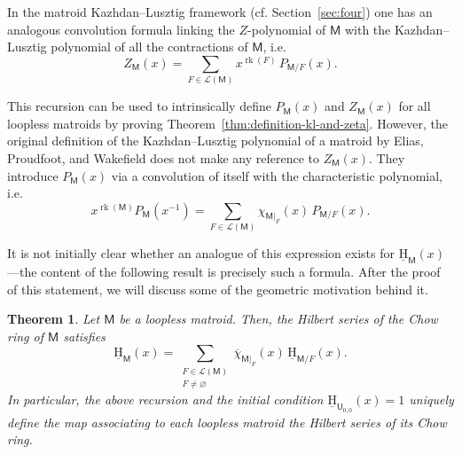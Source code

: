 \documentclass[11pt, a4paper, english]{amsart}
\theoremstyle{teoremas}
\newtheorem{theorem}{Theorem}[section]
\theoremstyle{definition}
\DeclareMathOperator{\rk}{rk}
\newcommand{\M}{\mathsf{M}}
\newcommand{\U}{\mathsf{U}}
\newcommand{\uH}{\underline{\mathrm{H}}}
\begin{document}
In the matroid Kazhdan--Lusztig framework (cf. Section~\ref{sec:four}) one has an analogous convolution formula linking the $Z$-polynomial of $\M$ with the Kazhdan--Lusztig polynomial of all the contractions of $\M$, i.e.
    \[ Z_{\M}(x) = \sum_{F\in\mathcal{L}(\M)} x^{\rk(F)}\, P_{\M/F}(x).\]

This recursion can be used to intrinsically define $P_{\M}(x)$ and $Z_{\M}(x)$ for all loopless matroids by proving Theorem~\ref{thm:definition-kl-and-zeta}. However, the original definition of the Kazhdan--Lusztig polynomial of a matroid by Elias, Proudfoot, and Wakefield \cite{elias-proudfoot-wakefield} does not make any reference to $Z_{\M}(x)$. They introduce $P_{\M}(x)$ via a convolution of itself with the characteristic polynomial, i.e.
    \[ x^{\rk(\M)}P_{\M}(x^{-1}) = \sum_{F\in\mathcal{L}(\M)} \chi_{\M|_F}(x)\, P_{\M/F}(x).\] 

It is not initially clear whether an analogue of this expression exists for $\uH_{\M}(x)$---the content of the following result is precisely such a formula. After the proof of this statement, we will discuss some of the geometric motivation behind it.

\begin{theorem}\label{thm:convolution-reduced-char-poly}
    Let $\M$ be a loopless matroid. Then, the Hilbert series of the Chow ring of $\M$ satisfies
    \begin{equation}
        \uH_{\M}(x) = \sum_{\substack{F\in\mathcal{L}(\M)\\F\neq\varnothing}} \overline{\chi}_{\M|_F}(x) \, \uH_{\M/F}(x).\label{eq:convolution-reduced-char-poly}
    \end{equation}
    In particular, the above recursion and the initial condition $\uH_{\U_{0,0}}(x)=1$  uniquely define the map associating to each loopless matroid the Hilbert series of its Chow ring. 
\end{theorem}
\end{document}
